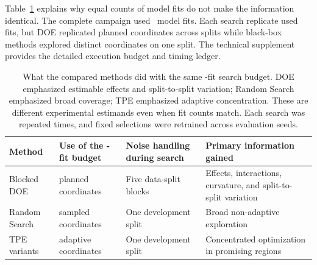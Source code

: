 \documentclass[12pt,a4paper]{article}
\begin{document}
Table~\ref{tab:methods} explains why equal counts of model fits do not make the information identical. The complete campaign used \numRevTotalFits\ model fits. Each search replicate used \numPubDesignRuns{} fits, but DOE replicated planned coordinates across splits while black-box methods explored distinct coordinates on one split. The technical supplement provides the detailed execution budget and timing ledger.
\begin{table}[H]
\centering
\small
\setlength{\tabcolsep}{5pt}
\renewcommand{\arraystretch}{1.3}
\begin{tabularx}{\textwidth}{@{}>{\raggedright\arraybackslash}p{}>{\raggedright\arraybackslash}p{}>{\raggedright\arraybackslash}p{}>{\raggedright\arraybackslash}X@{}}
\toprule
\textbf{Method} & \textbf{Use of the \numPubDesignRuns{}-fit budget} & \textbf{Noise handling during search} & \textbf{Primary information gained} \\
\midrule
Blocked DOE & \numPubCoordinates{} planned coordinates & Five data-split blocks & Effects, interactions, curvature, and split-to-split variation \\
Random Search & \numPubDesignRuns{} sampled coordinates & One development split & Broad non-adaptive exploration \\
TPE variants & \numPubDesignRuns{} adaptive coordinates & One development split & Concentrated optimization in promising regions \\
\bottomrule
\end{tabularx}
\caption{What the compared methods did with the same \numPubDesignRuns{}-fit search budget. DOE emphasized estimable effects and split-to-split variation; Random Search emphasized broad coverage; TPE emphasized adaptive concentration. These are different experimental estimands even when fit counts match. Each search was repeated \numPubSearchReplicates{} times, and fixed selections were retrained across \numPubEvalSeeds{} evaluation seeds.}
\label{tab:methods}
\end{table}
\end{document}
